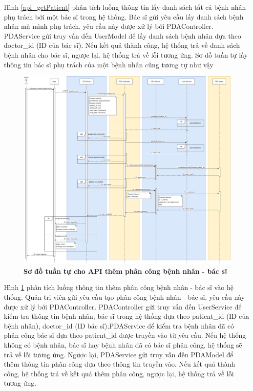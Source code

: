 Hình \ref{api_getPatient} phân tích luồng thông tin lấy danh sách tất cả bệnh nhân phụ trách bởi một bác sĩ trong hệ thống. Bác sĩ gửi yêu cầu lấy danh sách bệnh nhân mà mình phụ trách, 
yêu cầu này được xử lý bởi PDAController. PDAService gửi truy vấn đến UserModel để lấy danh sách bệnh nhân dựa theo doctor\_id (ID của bác sĩ). Nếu kết quả thành công, hệ thống trả về danh sách bệnh nhân cho bác sĩ, ngược lại, hệ thống trả về lỗi tương ứng.
Sơ đồ tuần tự lấy thông tin bác sĩ phụ trách của một bệnh nhân cũng tương tự như vậy
\begin{figure}[H]
  \centering
  \includegraphics[scale=0.3]{Images/sequence_api/addAssignment.png}
  \caption[Sơ đồ tuần tự cho API thêm phân công bệnh nhân - bác sĩ]{\bfseries \fontsize{12pt}{0pt}
  \selectfont Sơ đồ tuần tự cho API thêm phân công bệnh nhân - bác sĩ }
  \label{api_addPDA} %
\end{figure}
Hình \ref{api_addPDA} phân tích luồng thông tin thêm phân công bệnh nhân - bác sĩ vào hệ thống. Quản trị viên gửi yêu cầu tạo phân công bệnh nhân - bác sĩ,  
yêu cầu này được xử lý bởi PDAController. PDAController gửi truy vấn đến UserService để kiểm tra thông tin bệnh nhân, bác sĩ trong hệ thống dựa theo patient\_id (ID của bệnh nhân), doctor\_id (ID bác sĩ);PDAService để kiểm
tra bệnh nhân đã có phân công bác sĩ dựa theo patient\_id được truyền vào từ yêu cầu. Nếu hệ thống không có bệnh nhân, bác sĩ hay bệnh nhân đã có bác sĩ phân công, hệ thống sẽ trả về lỗi tương ứng. 
Ngược lại, PDAService gửi truy vấn đến PDAModel để thêm thông tin phân công dựa theo thông tin truyền vào. Nếu kết quả thành công, hệ thống trả về kết quả thêm phân công, ngược lại, hệ thống trả về lỗi tương ứng.

